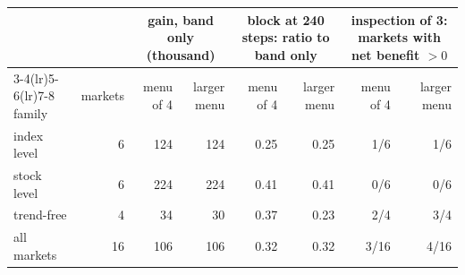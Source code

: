 \begin{tabular}{lrrrrrrr}
\toprule
& & \multicolumn{2}{c}{gain, band only (thousand)} & \multicolumn{2}{c}{block at 240 steps: ratio to band only} & \multicolumn{2}{c}{inspection of 3: markets with net benefit $>0$} \\
\cmidrule(lr){3-4}\cmidrule(lr){5-6}\cmidrule(lr){7-8}
family & markets & menu of 4 & larger menu & menu of 4 & larger menu & menu of 4 & larger menu \\
\midrule
index level & 6 & 124 & 124 & 0.25 & 0.25 & 1/6 & 1/6 \\
stock level & 6 & 224 & 224 & 0.41 & 0.41 & 0/6 & 0/6 \\
trend-free & 4 & 34 & 30 & 0.37 & 0.23 & 2/4 & 3/4 \\
all markets & 16 & 106 & 106 & 0.32 & 0.32 & 3/16 & 4/16 \\
\bottomrule
\end{tabular}
